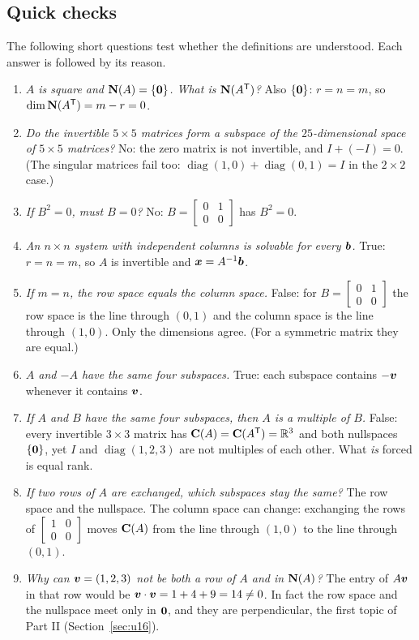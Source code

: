 \subsection{Quick checks}

The following short questions test whether the definitions are understood. Each answer is followed
by its reason.
\begin{enumerate}[1.]
\item \emph{$A$ is square and $\mathbf{N}(A)=\{\boldsymbol{0}\}$. What is $\mathbf{N}(A^{\mathsf{T}})$?} Also $\{\boldsymbol{0}\}$: $r=n=m$, so
$\dim\mathbf{N}(A^{\mathsf{T}})=m-r=0$.
\item \emph{Do the invertible $5\times5$ matrices form a subspace of the $25$-dimensional space of
$5\times5$ matrices?} No: the zero matrix is not invertible, and $I+(-I)=0$. (The singular matrices
fail too: $\operatorname{diag}(1,0)+\operatorname{diag}(0,1)=I$ in the $2\times2$ case.)
\item \emph{If $B^2=0$, must $B=0$?} No: $B=\begin{bmatrix}0&1\\0&0\end{bmatrix}$ has $B^2=0$.
\item \emph{An $n\times n$ system with independent columns is solvable for every $\boldsymbol{b}$.} True:
$r=n=m$, so $A$ is invertible and $\boldsymbol{x}=A^{-1}\boldsymbol{b}$.
\item \emph{If $m=n$, the row space equals the column space.} False: for
$B=\begin{bmatrix}0&1\\0&0\end{bmatrix}$ the row space is the line through $(0,1)$ and the column
space is the line through $(1,0)$. Only the dimensions agree. (For a symmetric matrix they are equal.)
\item \emph{$A$ and $-A$ have the same four subspaces.} True: each subspace contains $-\boldsymbol{v}$
whenever it contains $\boldsymbol{v}$.
\item \emph{If $A$ and $B$ have the same four subspaces, then $A$ is a multiple of $B$.} False: every
invertible $3\times3$ matrix has $\mathbf{C}(A)=\mathbf{C}(A^{\mathsf{T}})=\mathbb{R}^3$ and both nullspaces $\{\boldsymbol{0}\}$, yet
$I$ and $\operatorname{diag}(1,2,3)$ are not multiples of each other. What \emph{is} forced is equal
rank.
\item \emph{If two rows of $A$ are exchanged, which subspaces stay the same?} The row space and the
nullspace. The column space can change: exchanging the rows of $\begin{bmatrix}1&0\\0&0\end{bmatrix}$
moves $\mathbf{C}(A)$ from the line through $(1,0)$ to the line through $(0,1)$.
\item \emph{Why can $\boldsymbol{v}=(1,2,3)$ not be both a row of $A$ and in $\mathbf{N}(A)$?} The entry of
$A\boldsymbol{v}$ in that row would be $\boldsymbol{v}\cdot\boldsymbol{v}=1+4+9=14\ne0$. In fact the row space and the
nullspace meet only in $\boldsymbol{0}$, and they are perpendicular, the first topic of Part II
(Section~\ref{sec:u16}).
\end{enumerate}

